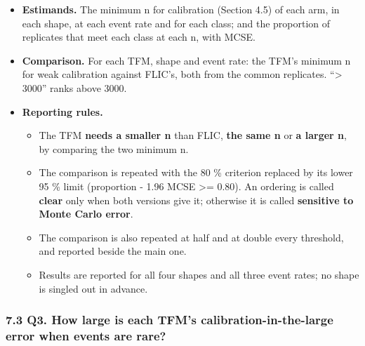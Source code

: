 \documentclass[
  10pt,
]{article}
\providecommand{\tightlist}{%
  \setlength{\itemsep}{0pt}\setlength{\parskip}{0pt}}
\begin{document}
\begin{itemize}
\tightlist
\item
  \textbf{Estimands.} The minimum n for calibration (Section
  4.5) of each arm, in each shape, at each event rate and
  for each class; and the proportion of replicates that meet
  each class at each n, with MCSE.
\item
  \textbf{Comparison.} For each TFM, shape and event rate:
  the TFM's minimum n for weak calibration against FLIC's,
  both from the common replicates. ``\textgreater{} 3000''
  ranks above 3000.
\item
  \textbf{Reporting rules.}

  \begin{itemize}
  \tightlist
  \item
    The TFM \textbf{needs a smaller n} than FLIC,
    \textbf{the same n} or \textbf{a larger n}, by comparing
    the two minimum n.
  \item
    The comparison is repeated with the 80 \% criterion
    replaced by its lower 95 \% limit (proportion - 1.96
    MCSE \textgreater= 0.80). An ordering is called
    \textbf{clear} only when both versions give it;
    otherwise it is called \textbf{sensitive to Monte Carlo
    error}.
  \item
    The comparison is also repeated at half and at double
    every threshold, and reported beside the main one.
  \item
    Results are reported for all four shapes and all three
    event rates; no shape is singled out in advance.
  \end{itemize}
\end{itemize}

\subsubsection{7.3 Q3. How large is each TFM's
calibration-in-the-large error when events are
rare?}\label{q3.-how-large-is-each-tfms-calibration-in-the-large-error-when-events-are-rare}
\end{document}
